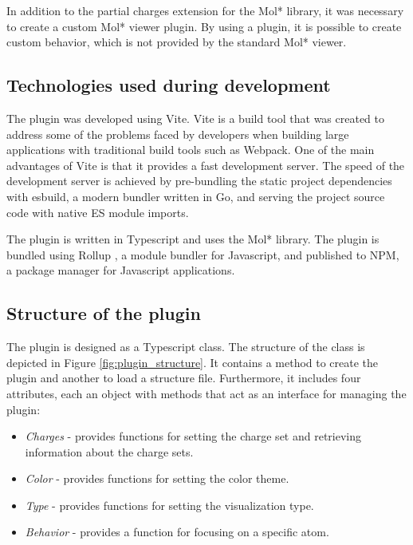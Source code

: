 \documentclass[
  digital,     %
  oneside,     %
  nosansbold,  %
  nocolorbold, %
  lof,         %
  lot,         %
]{fithesis4}
\begin{document}
In addition to the partial charges extension for the Mol* library, it was necessary to create a custom Mol* viewer plugin. By using a plugin, it is possible to create custom behavior, which is not provided by the standard Mol* viewer.

\subsection{Technologies used during development}

The plugin was developed using Vite. Vite is a build tool that was created to address some of the problems faced by developers when building large applications with traditional build tools such as Webpack. One of the main advantages of Vite is that it provides a fast development server. The speed of the development server is achieved by pre-bundling the static project dependencies with esbuild, a modern bundler written in Go, and serving the project source code with native ES module imports. \cite{vite}

The plugin is written in Typescript and uses the Mol* library. The plugin is bundled using Rollup \cite{rollup}, a module bundler for Javascript, and published to NPM, a package manager for Javascript applications. \cite{npm}

\subsection{Structure of the plugin}

The plugin is designed as a Typescript class. The structure of the class is depicted in Figure \ref{fig:plugin_structure}. It contains a method to create the plugin and another to load a structure file. Furthermore, it includes four attributes, each an object with methods that act as an interface for managing the plugin:

\begin{itemize}
  \item \textit{Charges} - provides functions for setting the charge set and retrieving information about the charge sets.
  \item \textit{Color} - provides functions for setting the color theme.
  \item \textit{Type} - provides functions for setting the visualization type.
  \item \textit{Behavior} - provides a function for focusing on a specific atom.
\end{itemize}
\end{document}
